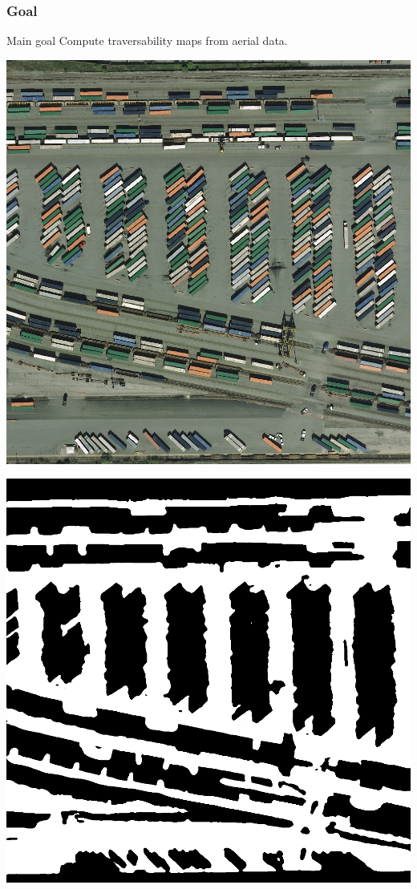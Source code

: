 \documentclass[usenames,dvipsnames,10pt]{beamer}
\begin{document}
\begin{frame}
\frametitle{Goal}
\begin{exampleblock}{Main goal}
	Compute traversability maps from aerial data.
\end{exampleblock}
\begin{center}
	\begin{minipage}{0.45\textwidth}
		\includegraphics[width=\textwidth]{graphics/aerial04.jpg} \\
		\centering\tiny{}
	\end{minipage} \hspace{0.25cm}
	\begin{minipage}{0.45\textwidth}
		\includegraphics[width=\textwidth]{graphics/aerial04-trav.jpg} \\

\end{minipage}
\end{center}
\end{frame}
\end{document}
